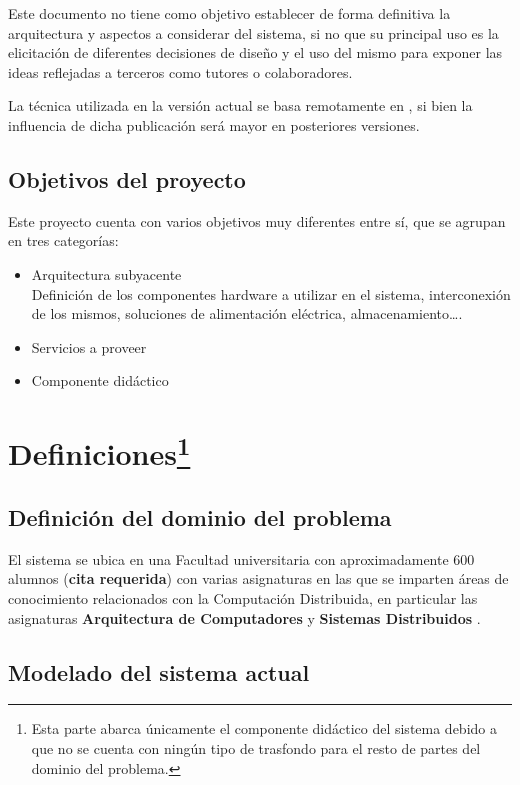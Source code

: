 Este documento no tiene como objetivo establecer de forma definitiva la arquitectura y aspectos a considerar del sistema, si no que su principal uso es la elicitación de diferentes decisiones de diseño y el uso del mismo para exponer las ideas reflejadas a terceros como tutores o colaboradores.

La técnica utilizada en la versión actual se basa remotamente en \cite{Toro99arequirements}, si bien la influencia de dicha publicación será mayor en posteriores versiones.

\subsection{Objetivos del proyecto}

Este proyecto cuenta con varios objetivos muy diferentes entre sí, que se agrupan en tres categorías:
\begin{itemize}
  \item Arquitectura subyacente\\
  Definición de los componentes hardware a utilizar en el sistema, interconexión de los mismos, soluciones de alimentación eléctrica, almacenamiento\dots.
  \item Servicios a proveer\\
  \item Componente didáctico\\
\end{itemize}

\section{Definiciones\protect\footnote{Esta parte abarca únicamente el componente didáctico del sistema debido a que no se cuenta con ningún tipo de trasfondo para el resto de partes del dominio del problema.}}

\subsection{Definición del dominio del problema}

El sistema se ubica en una Facultad universitaria con aproximadamente 600 alumnos (\textbf{cita requerida}) con varias asignaturas en las que se imparten áreas de conocimiento relacionados con la Computación Distribuida, en particular las asignaturas \textbf{Arquitectura de Computadores} y \textbf{Sistemas Distribuidos} \cite{DIA15GuiaAcademica}.

\subsection{Modelado del sistema actual}


